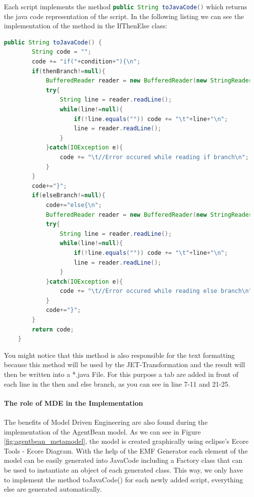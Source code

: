 Each script implements the method \lstinline[language=Java]{public String toJavaCode()} which returns the java code representation of the script.
In the following listing we can see the implementation of the method in the IfThenElse class:
\begin{lstlisting}[language = Java, caption = toJavaCode() implementation in the IfThenElse class]
	public String toJavaCode() {
		String code = "";
		code += "if("+condition+"){\n";
		if(thenBranch!=null){
			BufferedReader reader = new BufferedReader(new StringReader(thenBranch.toJavaCode()));
			try{
				String line = reader.readLine();
				while(line!=null){
					if(!line.equals("")) code += "\t"+line+"\n";
					line = reader.readLine();
				}
			}catch(IOException e){
				code += "\t//Error occured while reading if branch\n";
			}
		}
		code+="}";
		if(elseBranch!=null){
			code+="else{\n";
			BufferedReader reader = new BufferedReader(new StringReader(elseBranch.toJavaCode()));
			try{
				String line = reader.readLine();
				while(line!=null){
					if(!line.equals("")) code += "\t"+line+"\n";
					line = reader.readLine();
				}
			}catch(IOException e){
				code += "\t//Error occured while reading else branch\n";
			}
			code+="}";
		}
		return code;
	}
\end{lstlisting}

You might notice that this method is also responsible for the text formatting because this method will be used by the JET-Transformation and the result will then be written into a *.java File. For this purpose a tab are added in front of each line in the then and else branch, as you can see in line 7-11 and 21-25.\\\\
\textbf{The role of MDE in the Implementation}\\\\
The benefits of Model Driven Engineering are also found during the implementation of the AgentBean model. As we can see in Figure \ref{fig:agentbean_metamodel}, the model is created graphically using eclipse's Ecore Tools - Ecore Diagram. With the help of the EMF Generator each element of the model can be easily generated into JavaCode including a Factory class that can be used to instantiate an object of each generated class. This way, we only have to implement the method toJavaCode() for each newly added script, everything else are generated automatically. 


